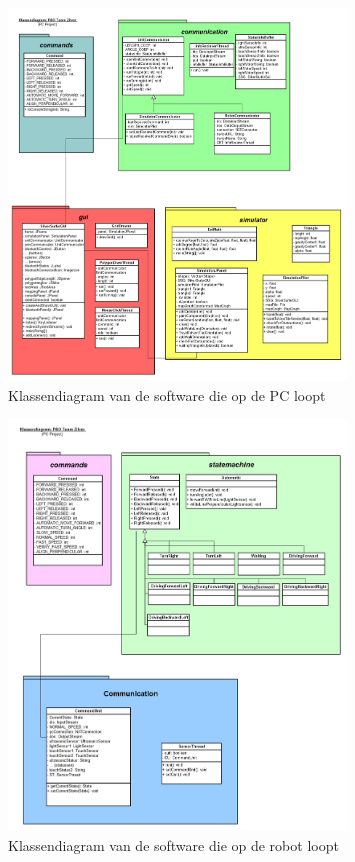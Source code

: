 \documentclass[tt3]{penoverslag}
\begin{document}
\begin{figure}[tbp]
\begin{center}
    \includegraphics[width=0.8\textwidth]{KlassendiagramPC}
    \caption{Klassendiagram van de software die op de PC loopt}
    \label{fig:klasDiaPC}
\end{center}
\end{figure}

\begin{figure}[tbp]
\begin{center}
    \includegraphics[width=0.8\textwidth]{KlassendiagramNXT}
    \caption{Klassendiagram van de software die op de robot loopt}
	\label{fig:klasDiaNXT}
\end{center}
\end{figure}
\end{document}
